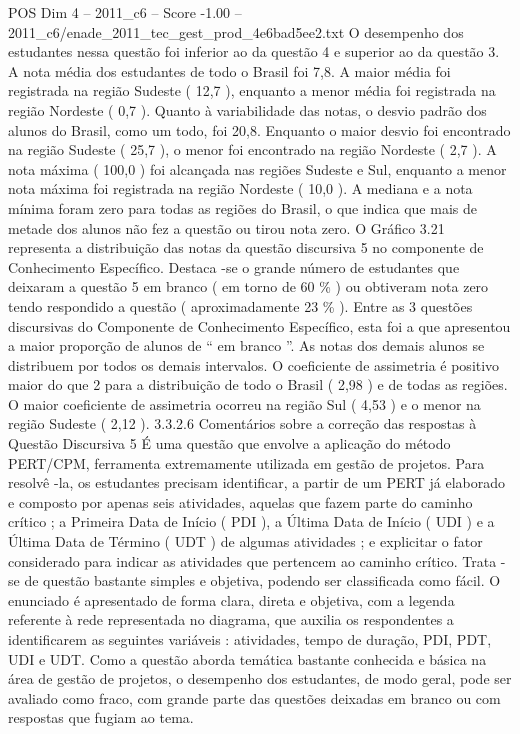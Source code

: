\begin{textsample}{POS Dim 4 – 2011\_c6 – Score -1.00 – 2011\_c6/enade\_2011\_tec\_gest\_prod\_4e6bad5ee2.txt}
O desempenho dos estudantes nessa questão foi inferior ao da questão 4 e superior ao da questão 3.
A nota média dos estudantes de todo o Brasil foi 7,8.
A maior média foi registrada na região Sudeste ( 12,7 ), enquanto a menor média foi registrada na região Nordeste ( 0,7 ).
Quanto à variabilidade das notas, o desvio padrão dos alunos do Brasil, como um todo, foi 20,8.
Enquanto o maior desvio foi encontrado na região Sudeste ( 25,7 ), o menor foi encontrado na região Nordeste ( 2,7 ).
A nota máxima ( 100,0 ) foi alcançada nas regiões Sudeste e Sul, enquanto a menor nota máxima foi registrada na região Nordeste ( 10,0 ).
A mediana e a nota mínima foram zero para todas as regiões do Brasil, o que indica que mais de metade dos alunos não fez a questão ou tirou nota zero.
O Gráfico 3.21 representa a distribuição das notas da questão discursiva 5 no componente de Conhecimento Específico.
Destaca -se o grande número de estudantes que deixaram a questão 5 em branco ( em torno de 60 \% ) ou obtiveram nota zero tendo respondido a questão ( aproximadamente 23 \% ).
Entre as 3 questões discursivas do Componente de Conhecimento Específico, esta foi a que apresentou a maior proporção de alunos de “ em branco ”.
As notas dos demais alunos se distribuem por todos os demais intervalos.
O coeficiente de assimetria é positivo maior do que 2 para a distribuição de todo o Brasil ( 2,98 ) e de todas as regiões.
O maior coeficiente de assimetria ocorreu na região Sul ( 4,53 ) e o menor na região Sudeste ( 2,12 ). 3.3.2.6 Comentários sobre a correção das respostas à Questão Discursiva 5 É uma questão que envolve a aplicação do método PERT/CPM, ferramenta extremamente utilizada em gestão de projetos.
Para resolvê -la, os estudantes precisam identificar, a partir de um PERT já elaborado e composto por apenas seis atividades, aquelas que fazem parte do caminho crítico ; a Primeira Data de Início ( PDI ), a Última Data de Início ( UDI ) e a Última Data de Término ( UDT ) de algumas atividades ; e explicitar o fator considerado para indicar as atividades que pertencem ao caminho crítico.
Trata -se de questão bastante simples e objetiva, podendo ser classificada como fácil.
O enunciado é apresentado de forma clara, direta e objetiva, com a legenda referente à rede representada no diagrama, que auxilia os respondentes a identificarem as seguintes variáveis : atividades, tempo de duração, PDI, PDT, UDI e UDT.
Como a questão aborda temática bastante conhecida e básica na área de gestão de projetos, o desempenho dos estudantes, de modo geral, pode ser avaliado como fraco, com grande parte das questões deixadas em branco ou com respostas que fugiam ao tema.

\end{textsample}
